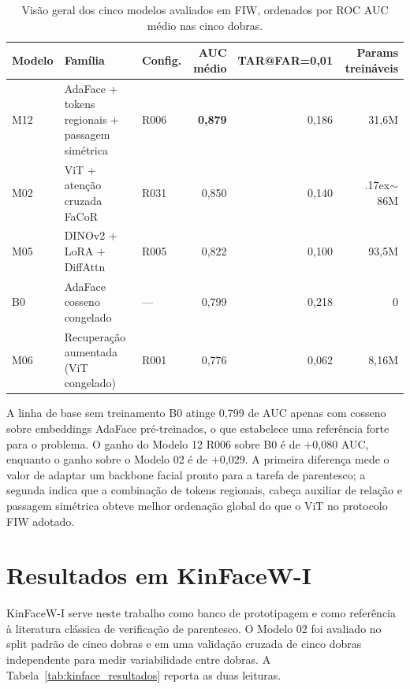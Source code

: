 \begin{table}[h]
\centering
\caption{Visão geral dos cinco modelos avaliados em FIW, ordenados por ROC AUC médio nas cinco dobras.}
\label{tab:overview_runs}
\begin{tabular}{lllrrr}
\hline
\textbf{Modelo} & \textbf{Família} & \textbf{Config.} & \textbf{AUC médio} & \textbf{TAR@FAR=0,01} & \textbf{Params treináveis} \\
\hline
M12 & AdaFace + tokens regionais + passagem simétrica & R006 & \textbf{0{,}879} & 0{,}186 & 31{,}6M \\
M02 & ViT + atenção cruzada FaCoR         & R031 & 0{,}850          & 0{,}140          & {\raise.17ex\hbox{$\scriptstyle\sim$}}86M \\
M05 & DINOv2 + LoRA + DiffAttn            & R005 & 0{,}822          & 0{,}100          & 93{,}5M \\
B0  & AdaFace cosseno congelado           & ---  & 0{,}799          & 0{,}218          & 0 \\
M06 & Recuperação aumentada (ViT congelado) & R001 & 0{,}776        & 0{,}062          & 8{,}16M \\
\hline
\end{tabular}
\end{table}

A linha de base sem treinamento B0 atinge 0,799 de AUC apenas com cosseno sobre embeddings AdaFace pré-treinados, o que estabelece uma referência forte para o problema. O ganho do Modelo 12 R006 sobre B0 é de +0,080 AUC, enquanto o ganho sobre o Modelo 02 é de +0,029. A primeira diferença mede o valor de adaptar um backbone facial pronto para a tarefa de parentesco; a segunda indica que a combinação de tokens regionais, cabeça auxiliar de relação e passagem simétrica obteve melhor ordenação global do que o ViT no protocolo FIW adotado.

\section{Resultados em KinFaceW-I}

KinFaceW-I serve neste trabalho como banco de prototipagem e como referência à literatura clássica de verificação de parentesco. O Modelo 02 foi avaliado no split padrão de cinco dobras e em uma validação cruzada de cinco dobras independente para medir variabilidade entre dobras. A Tabela~\ref{tab:kinface_resultados} reporta as duas leituras.

